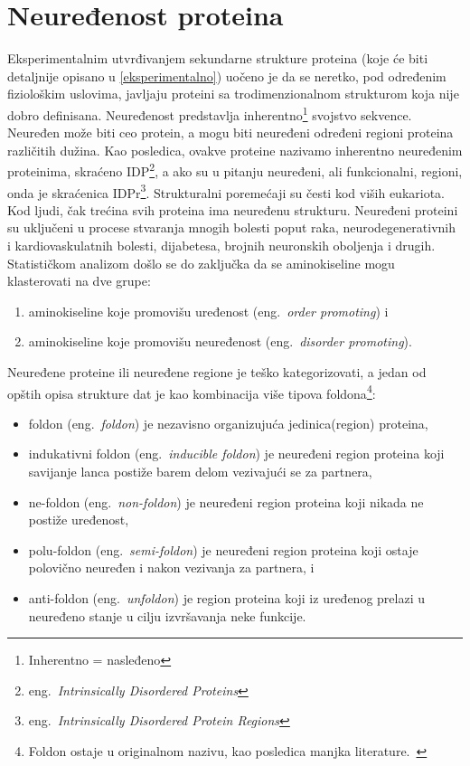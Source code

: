 \section{Neuređenost proteina}

Eksperimentalnim utvrđivanjem sekundarne strukture proteina (koje će biti detaljnije opisano u \ref{eksperimentalno}) uočeno je da se neretko, pod određenim fiziološkim uslovima, javljaju proteini sa trodimenzionalnom strukturom koja nije dobro definisana.
Neuređenost predstavlja inherentno\footnote{Inherentno = nasleđeno} svojstvo sekvence. Neuređen može biti ceo protein, a mogu biti neuređeni određeni regioni proteina različitih dužina. Kao posledica, ovakve proteine nazivamo inherentno neuređenim proteinima, skraćeno IDP\footnote{eng.~{\em Intrinsically Disordered Proteins}}, a ako su u pitanju neuređeni, ali funkcionalni, regioni, onda je skraćenica IDPr\footnote{eng.~{\em Intrinsically Disordered Protein Regions}}. Strukturalni poremećaji su česti kod viših eukariota. Kod ljudi, čak trećina svih proteina ima neuređenu strukturu. Neuređeni proteini su uključeni u procese stvaranja mnogih bolesti poput raka, neurodegenerativnih i kardiovaskulatnih bolesti, dijabetesa, brojnih neuronskih oboljenja i drugih. Statističkom analizom došlo se do zaključka da se aminokiseline mogu klasterovati na dve grupe: 
\begin{enumerate}
\item aminokiseline koje promovišu uređenost (eng.~{\em order promoting}) i
\item aminokiseline koje promovišu neuređenost (eng.~{\em disorder promoting}).
\end{enumerate}
Neuređene proteine ili neuređene regione je teško kategorizovati, a jedan od opštih opisa strukture dat je kao kombinacija više tipova foldona\footnote{Foldon ostaje u originalnom nazivu, kao posledica manjka literature.~\cite{Vinterhalter}}:
\begin{itemize}
\item foldon (eng.~{\em foldon}) je nezavisno organizujuća jedinica(region) proteina,
\item indukativni foldon (eng.~{\em inducible foldon}) je neuređeni region proteina koji savijanje lanca postiže barem delom vezivajući se za partnera,
\item ne-foldon (eng.~{\em non-foldon}) je neuređeni region proteina koji nikada ne postiže uređenost,
\item polu-foldon (eng.~{\em semi-foldon}) je neuređeni region proteina koji ostaje polovično neuređen i nakon vezivanja za partnera, i 
\item anti-foldon (eng.~{\em unfoldon}) je region proteina koji iz uređenog prelazi u neuređeno stanje u cilju izvršavanja neke funkcije.
\end{itemize}

